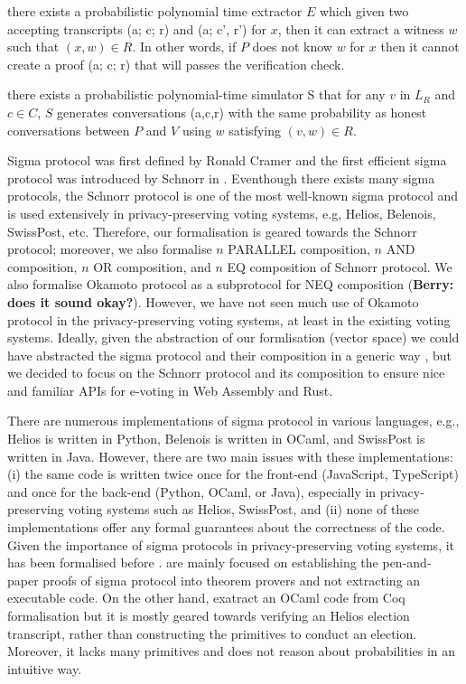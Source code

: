 \documentclass[sigconf]{acmart}
\begin{document}
there exists a probabilistic polynomial time extractor $E$ which given 
two accepting transcripts (a; c; r) and (a; c', r') for $x$, then 
it can extract a witness $w$ such that $(x, w) \in R$. In other words, 
if $P$ does not know $w$ for $x$ then it cannot create a proof 
(a; c; r) that will passes the verification check. 

there exists a probabilistic polynomial-time simulator S that for  
any $v$ in $L_R$ and $c \in C$, $S$ generates conversations 
(a,c,r) with the same probability as honest conversations between 
$P$ and $V$ using $w$ satisfying $(v,w) \in R$.






Sigma protocol was first defined by Ronald Cramer \cite{cramer1996modular} 
and the first efficient sigma protocol was introduced by Schnorr in \cite{schnorr1991efficient}. 
Eventhough there exists many sigma protocols, the Schnorr protocol is one of the most well-known
sigma protocol and is used extensively in privacy-preserving voting systems, e.g, Helios, 
Belenois, SwissPost, etc. Therefore, our formalisation is geared towards the Schnorr protocol; moreover, we 
also formalise $n$ PARALLEL composition, $n$ AND composition, $n$ OR composition, 
and $n$ EQ composition of Schnorr protocol. We also formalise Okamoto protocol as a subprotocol 
for NEQ composition (\textbf{Berry: does it sound okay?}). However, we have not seen 
much use of Okamoto protocol in the privacy-preserving voting systems, 
at least in the existing voting systems. Ideally, given the abstraction of 
our formlisation (vector space) we could have abstracted the 
sigma protocol and their composition in a generic way \cite{10.1007/978-3-642-02384-2_17},
but we decided to focus on the Schnorr protocol and its composition to ensure nice and familiar APIs 
for e-voting in Web Assembly and Rust.




There are numerous implementations of sigma protocol in various languages, 
e.g., Helios is written in Python, Belenois is written in OCaml, and SwissPost is written in Java.
However, there are two main issues with these implementations: (i)  
the same code is written twice 
once for the front-end (JavaScript, TypeScript) and once for the back-end (Python, OCaml, or Java),
especially in privacy-preserving voting systems such as Helios, SwissPost, and 
(ii) none of these implementations offer any formal guarantees about the correctness of the code.
Given the importance of sigma protocols in privacy-preserving voting systems,
it has been formalised before  \cite{5552642,butler2019formalisation,10.1145/3319535.3354247}. 
\cite{5552642,butler2019formalisation} are mainly focused on establishing the 
pen-and-paper proofs of sigma protocol into theorem provers and not extracting an executable code.
On the other hand, \cite{10.1145/3319535.3354247} exatract an OCaml code from Coq 
formalisation but it is mostly geared towards verifying an Helios election transcript, 
rather than constructing the primitives to conduct an election. Moreover, 
it lacks many primitives and does not reason about probabilities in an intuitive way.
\end{document}
